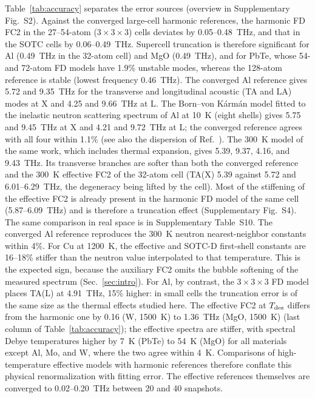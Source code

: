\documentclass[aip,jap,reprint,amsmath,amssymb,floatfix]{revtex4-2}
\begin{document}
Table~\ref{tab:accuracy} separates the error sources (overview in
Supplementary Fig.~S2). Against the converged
large-cell harmonic references, the harmonic FD FC2 in the 27--54-atom
($3\times3\times3$) cells deviates by 0.05--0.48~THz, and that in the SOTC
cells by 0.06--0.49~THz. Supercell truncation is therefore significant for Al
(0.49~THz in the 32-atom cell) and MgO (0.49~THz), and for PbTe, whose 54- and
72-atom FD models have 1.9\% unstable modes, whereas the 128-atom reference is
stable (lowest frequency 0.46~THz). The converged Al reference
gives 5.72 and 9.35~THz for the transverse and longitudinal acoustic (TA and
LA) modes at X and 4.25 and 9.66~THz at
L. The Born--von K\'arm\'an model fitted to the inelastic neutron
scattering spectrum of Al at 10~K (eight shells) \cite{kresch2008,kresch2009thesis}
gives 5.75 and 9.45~THz at X and 4.21 and 9.72~THz at L; the converged reference agrees with all four within 1.1\%
(see also the dispersion of Ref.~). The 300~K model of the same
work, which includes thermal expansion, gives 5.39, 9.37, 4.16, and
9.43~THz. Its transverse branches are softer than both the converged
reference and the 300~K effective FC2 of the 32-atom cell (TA(X) 5.39 against
5.72 and 6.01--6.29~THz, the degeneracy being lifted by the cell). Most of the
stiffening of the effective FC2 is already present in the harmonic FD model of
the same cell (5.87--6.09~THz) and is therefore a truncation effect
(Supplementary Fig.~S4). The same comparison in real space is in Supplementary
Table~S10. The converged Al reference reproduces the 300~K neutron
nearest-neighbor constants within 4\%. For Cu at 1200~K, the effective and
SOTC-D first-shell constants are 16--18\% stiffer than the neutron value
interpolated to that temperature. This is the expected sign, because the
auxiliary FC2 omits the bubble softening of the measured spectrum
(Sec.~\ref{sec:intro}). For Al, by contrast,
the $3\times3\times3$ FD model places TA(L) at 4.91~THz, 15\% higher: in
small cells the truncation error is of the same size as the thermal effects
studied here. The effective FC2 at
$T_{\rm des}$ differs from the harmonic one by 0.16 (W, 1500~K) to 1.36~THz
(MgO, 1500~K) (last column of Table~\ref{tab:accuracy}); the effective
spectra are stiffer, with spectral Debye temperatures higher by 7~K (PbTe) to
54~K (MgO) for all materials except Al, Mo, and W, where the two agree within 4~K. Comparisons of high-temperature effective models with harmonic
references therefore conflate this physical
renormalization with fitting error. The effective references themselves are
converged to 0.02--0.20~THz between 20 and 40 snapshots.
\end{document}
